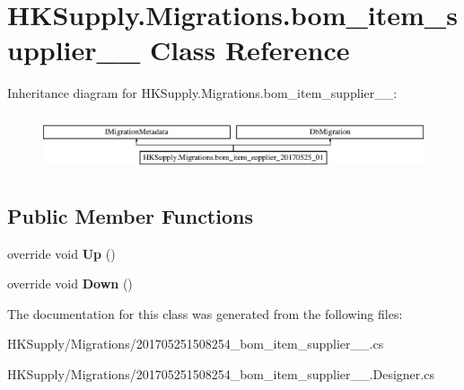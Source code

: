 \hypertarget{class_h_k_supply_1_1_migrations_1_1bom__item__supplier__20170525__01}{}\section{H\+K\+Supply.\+Migrations.\+bom\+\_\+item\+\_\+supplier\+\_\+\_ Class Reference}
\label{class_h_k_supply_1_1_migrations_1_1bom__item__supplier__20170525__01}
Inheritance diagram for H\+K\+Supply.\+Migrations.\+bom\+\_\+item\+\_\+supplier\+\_\+\_\+:\begin{figure}[H]
\begin{center}
\leavevmode
\includegraphics[height=1.691843cm]{class_h_k_supply_1_1_migrations_1_1bom__item__supplier__20170525__01}
\end{center}
\end{figure}
\subsection*{Public Member Functions}
\begin{DoxyCompactItemize}
\item 
\mbox{\label{class_h_k_supply_1_1_migrations_1_1bom__item__supplier__20170525__01_aa50241e4e0ad5fe68d92850218b95885}} 
override void {\bfseries Up} ()
\item 
\mbox{\label{class_h_k_supply_1_1_migrations_1_1bom__item__supplier__20170525__01_abfe07f6b0045e21adcb63e163c01a296}} 
override void {\bfseries Down} ()
\end{DoxyCompactItemize}


The documentation for this class was generated from the following files\+:\begin{DoxyCompactItemize}
\item 
H\+K\+Supply/\+Migrations/201705251508254\+\_\+bom\+\_\+item\+\_\+supplier\+\_\+\_.\+cs\item 
H\+K\+Supply/\+Migrations/201705251508254\+\_\+bom\+\_\+item\+\_\+supplier\+\_\+\_.\+Designer.\+cs\end{DoxyCompactItemize}
